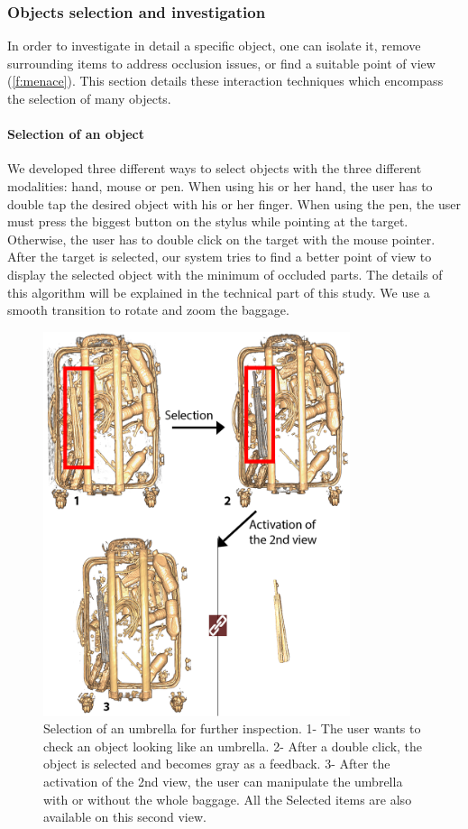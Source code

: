 \subsubsection{ Objects selection and investigation}
In order to investigate in detail a specific object, one can isolate it, remove surrounding items to address occlusion issues, or find a suitable point of view (\autoref{f:menace}). This section details these interaction techniques which encompass the selection of  many objects.


\paragraph{	Selection of an object}
We developed three different ways to select objects with the three different modalities: hand, mouse or pen. When using his or her hand, the user has to double tap the desired object with his or her finger. When using the pen, the user must press the biggest button on the stylus while pointing at the target. Otherwise, the user has to double click on the target with the mouse pointer. After the target is selected, our system tries to find a better point of view to display the selected object with the minimum of occluded parts. The details of this algorithm will be explained in the technical part of this study. We use a smooth transition to rotate and zoom the baggage. 


\begin{figure}
\centering   
	\includegraphics[width=9cm]{Figures/selection.png}
	\caption[Selection of an umbrella for further inspection.]{ Selection of an umbrella for further inspection.  1- The user wants to check an object looking like an umbrella. 2- After a double click, the object is selected and becomes gray as a feedback. 3- After the activation of the 2nd view, the user can manipulate the umbrella with or without the whole baggage. All the Selected items are also available on this second view. }
	\label{f:selection}
\end{figure}



